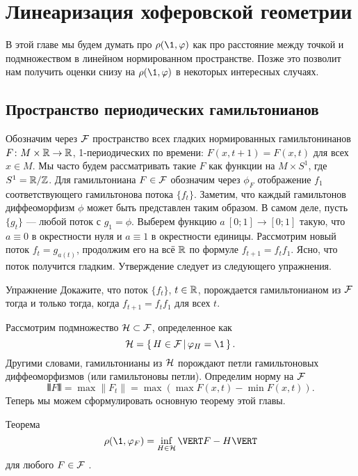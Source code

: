 \chapter{Линеаризация хоферовской геометрии}

В этой главе мы будем думать про $\rho (\1, \phi)$ как про расстояние между точкой и подмножеством в линейном нормированном пространстве.
Позже это позволит нам получить оценки снизу на $\rho (\1, \phi)$ в некоторых интересных случаях.

\section{Пространство периодических гамильтонианов}

Обозначим через $\mathcal{F}$ пространство всех гладких нормированных гамильтонинанов $F\colon M \times \mathbb{R} \to \mathbb{R}$, 1-периодических по времени: $F (x, t + 1) = F (x, t)$ для всех $x \in M$.
Мы часто будем рассматривать такие $F$ как функции на $M \times S^1$, где $S^1 = \mathbb{R} / \mathbb{Z}$.
Для гамильтониана $F \in \mathcal{F}$ обозначим через $\phi_F$ отображение $f_1$ соответствующего гамильтонова потока $\{f_t\}$.
Заметим, что каждый гамильтонов диффеоморфизм $\phi$ может быть представлен таким образом.
В самом деле, пусть $\{g_t\}$ --- любой поток с $g_1 = \phi$.
Выберем функцию $a\: [0; 1] \to [0; 1]$ такую, что $a \equiv 0$ в окрестности нуля и $a \equiv 1$ в окрестности единицы.
Рассмотрим новый поток $f_t = g_{a(t)}$, 
продолжим его на всё $\mathbb{R}$ по формуле $f_{t+1} = f_t f_1$.
Ясно, что поток получится гладким.
Утверждение следует из следующего упражнения.

\begin{thm}{Упражнение}\label{5.1.A}
Докажите, что  поток $\{f_t\}$, $t \in \mathbb{R}$, порождается гамильтонианом из $\mathcal{F}$ тогда и только тогда, когда $f_{t+1} = f_t f_1$ для всех $t$.
\end{thm}

Рассмотрим подмножество $\mathcal{H} \subset \mathcal{F}$, определенное как 
\[\H = \set{H \in \F}{\phi_H = \1}.\]
Другими словами, гамильтонианы из $\mathcal{H}$ порождают петли гамильтоновых диффеоморфизмов (или гамильтоновы петли).
Определим норму на $\mathcal{F}$ 
\[\VERT F \VERT = \max \| F_t \| = \max (\max F (x, t) - \min F (x, t)).\]
Теперь мы можем сформулировать основную теорему этой главы.

\begin{thm}{Теорема}\label{5.1.B}
\[\rho (\1, \phi_F) = \inf_{H\in\H} \VERT F - H \VERT\]
для любого $F \in \mathcal{F}$ .
\end{thm}

